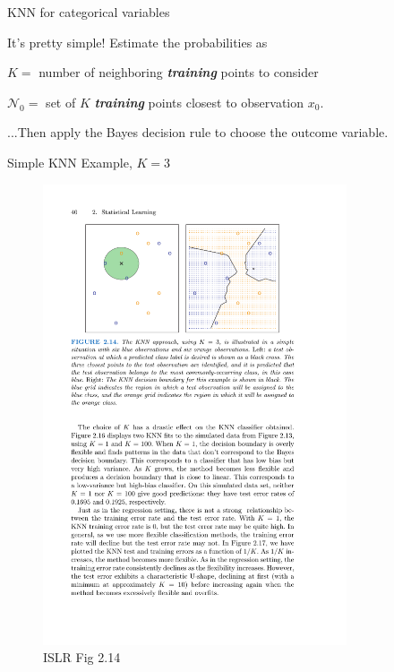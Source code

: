 \documentclass[aspectratio=169]{beamer}
\begin{document}
\begin{frame}{KNN for categorical variables}

It's pretty simple!  Estimate the probabilities as



$K =$ number of neighboring \textbf{\textit{training}} points to consider

 $\mathcal{N}_0 = $ set of $K$ \textbf{\textit{training}} points closest to observation $x_0$.
 
 \vspace{5mm}
 
...Then apply the Bayes decision rule to choose the outcome variable.

 
\end{frame}

\begin{frame}{Simple KNN Example, $K = 3$}

\begin{figure}
\includegraphics[width=0.8\textwidth]{KNN_example}
\caption*{ISLR Fig 2.14}
\end{figure}
\end{frame}
\end{document}
